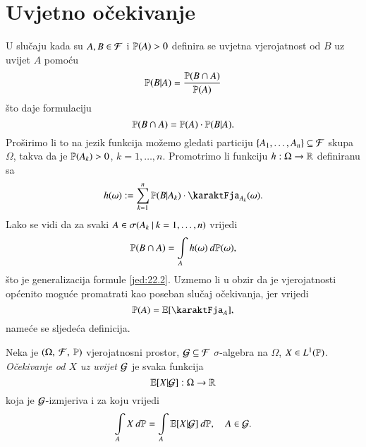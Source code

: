 
\chapter{Uvjetno o\v cekivanje}

U slu\v caju kada su $A, B \in \mathcal{F}$ i $\mathbb{P} (A) > 0$ definira se uvjetna vjerojatnost od $B$ uz uvijet $A$ pomo\' cu
\begin{equation}    \label{jed:22.1}
    \mathbb{P} (B | A) = \frac{\mathbb{P} (B \cap A)}{\mathbb{P} (A)}
\end{equation}
\v sto daje formulaciju
\begin{equation}    \label{jed:22.2}
    \mathbb{P} (B \cap A) = \mathbb{P} (A) \cdot \mathbb{P} (B | A).
\end{equation}
Pro\v sirimo li to na jezik funkcija mo\v zemo gledati particiju $\{A_1, \ldots, A_n\} \subseteq \mathcal{F}$ skupa $\Omega$, takva da je $\mathbb{P} (A_k) > 0$, $k = 1, \ldots, n$.
Promotrimo li funkciju $h : \Omega \to \mathbb{R}$ definiranu sa
\begin{equation}    \label{jed:22.3}
    h (\omega) := \suma{k = 1}{n} \masP (B | A_k) \cdot \karaktFja_{A_k} (\omega).
\end{equation}
Lako se vidi da za svaki $A \in \sigma({A_k} \: | \: {k = 1, \ldots, n})$ vrijedi
\begin{equation}    \label{jed:22.4}
    \mathbb{P} (B \cap A) = \int\limits_A h (\omega) \: d \mathbb{P} (\omega),
\end{equation}
\v sto je generalizacija formule \eqref{jed:22.2}.
Uzmemo li u obzir da je vjerojatnosti op\' cenito mogu\' ce promatrati kao poseban slu\v caj o\v cekivanja, jer vrijedi
\begin{equation*}
    \masP (A) = \masE [ \karaktFja_A ],
\end{equation*}
name\' ce se sljede\' ca definicija.

\begin{defn}    \label{defn:22.5}
    Neka je $(\Omega, \: \mathcal{F}, \: \mathbb{P})$ vjerojatnosni prostor, $\mathcal{G} \subseteq \mathcal{F}$ $\sigma$-algebra na $\Omega$, $X \in L^1 (\mathbb{P})$.
    \emph{O\v cekivanje od $X$ uz uvijet $\mathcal{G}$} je svaka funkcija
    \begin{equation*}
        \mathbb{E} [X | \mathcal{G}] : \Omega \to \mathbb{R}
    \end{equation*}
    koja je $\mathcal{G}$-izmjeriva i za koju vrijedi
    \begin{equation*}
        \int\limits_A X \: d \mathbb{P} = \int\limits_A \mathbb{E} [X | \mathcal{G}] \: d \mathbb{P}, \quad A \in \mathcal{G}.
    \end{equation*}
\end{defn}

